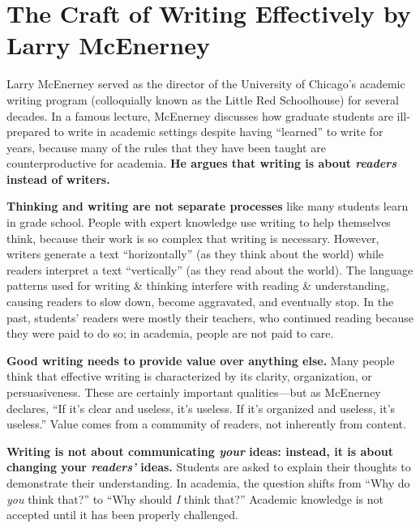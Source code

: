 
\section{The Craft of Writing Effectively by Larry McEnerney}
\label{sec:writing_effectively}

Larry McEnerney served as the director of the University of Chicago's academic writing program (colloquially known as the Little Red Schoolhouse) for several decades.
In a famous lecture, McEnerney discusses how graduate students are ill-prepared to write in academic settings despite having ``learned'' to write for years, because many of the rules that they have been taught are counterproductive for academia.
\textbf{He argues that writing is about \textit{readers} instead of writers.}

\textbf{Thinking and writing are not separate processes} like many students learn in grade school.
People with expert knowledge use writing to help themselves think, because their work is so complex that writing is necessary.
However, writers generate a text ``horizontally'' (as they think about the world) while readers interpret a text ``vertically'' (as they read about the world).
The language patterns used for writing \& thinking interfere with reading \& understanding, causing readers to slow down, become aggravated, and eventually stop.
In the past, students' readers were mostly their teachers, who continued reading because they were paid to do so; in academia, people are not paid to care.

\textbf{Good writing needs to provide value over anything else.}
Many people think that effective writing is characterized by its clarity, organization, or persuasiveness.
These are certainly important qualities---but as McEnerney declares, ``If it's clear and useless, it's useless.
If it's organized and useless, it's useless.''
Value comes from a community of readers, not inherently from content.

\textbf{Writing is not about communicating \textit{your} ideas: instead, it is about changing your \textit{readers'} ideas.}
Students are asked to explain their thoughts to demonstrate their understanding.
In academia, the question shifts from ``Why do \textit{you} think that?'' to ``Why should \textit{I} think that?''
Academic knowledge is not accepted until it has been properly challenged.

